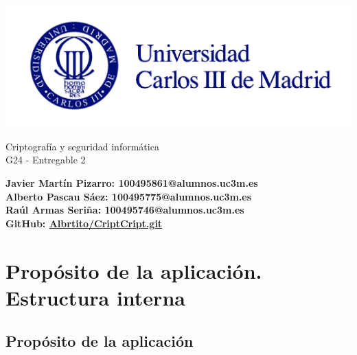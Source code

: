 \documentclass[a4paper,11pt]{article}
\begin{document}
\begin{titlepage}
    \begin{center}
        \vspace*{1cm} 
        \includegraphics[width=1\textwidth]{./images/uc3m.jpg}
        
        \vspace*{3cm} 
        
        {\LARGE Criptografía y seguridad informática\\[0.5cm]} 
        {\LARGE G24 - Entregable 2 \\[0.5cm]}
        
        \vspace*{6cm}
        
        \textbf{Javier Martín Pizarro: 100495861@alumnos.uc3m.es} \\[0.5cm]
        \textbf{Alberto Pascau Sáez: 100495775@alumnos.uc3m.es} \\[0.5cm]
        \textbf{Raúl Armas Seriña: 100495746@alumnos.uc3m.es} \\[0.5cm]
        
        \vspace*{3cm}
        \textbf{GitHub:
        \href{https://github.com/Albrtito/CriptCript.git}{Albrtito/CriptCript.git}}\\[0.5cm]

    \end{center}
\end{titlepage}

\newpage
\tableofcontents
\vspace{2cm}

\newpage
\section{Propósito de la aplicación. Estructura interna}

\subsection{Propósito de la aplicación}
\end{document}
